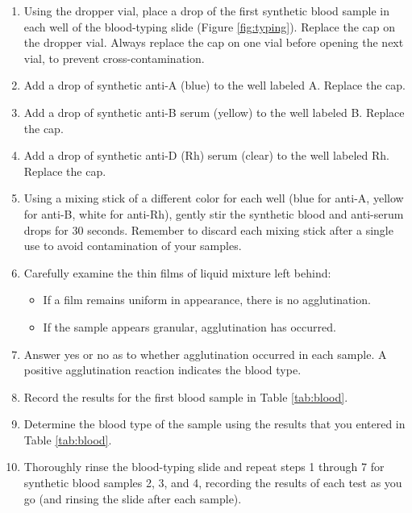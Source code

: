 \documentclass[]{book}
\providecommand{\tightlist}{%
  \setlength{\itemsep}{0pt}\setlength{\parskip}{0pt}}
\theoremstyle{definition}
\theoremstyle{definition}
\theoremstyle{definition}
\theoremstyle{remark}
\begin{document}
\begin{enumerate}
\def\labelenumi{\arabic{enumi}.}
\tightlist
\item
  Using the dropper vial, place a drop of the first synthetic blood
  sample in each well of the blood-typing slide (Figure
  \ref{fig:typing}). Replace the cap on the dropper vial. Always replace
  the cap on one vial before opening the next vial, to prevent
  cross-contamination.
\item
  Add a drop of synthetic anti-A (blue) to the well labeled A. Replace
  the cap.
\item
  Add a drop of synthetic anti-B serum (yellow) to the well labeled B.
  Replace the cap.
\item
  Add a drop of synthetic anti-D (Rh) serum (clear) to the well labeled
  Rh. Replace the cap.
\item
  Using a mixing stick of a different color for each well (blue for
  anti-A, yellow for anti-B, white for anti-Rh), gently stir the
  synthetic blood and anti-serum drops for 30 seconds. Remember to
  discard each mixing stick after a single use to avoid contamination of
  your samples.
\item
  Carefully examine the thin films of liquid mixture left behind:

  \begin{itemize}
  \tightlist
  \item
    If a film remains uniform in appearance, there is no agglutination.
  \item
    If the sample appears granular, agglutination has occurred.
  \end{itemize}
\item
  Answer yes or no as to whether agglutination occurred in each sample.
  A positive agglutination reaction indicates the blood type.
\item
  Record the results for the first blood sample in Table
  \ref{tab:blood}.
\item
  Determine the blood type of the sample using the results that you
  entered in Table \ref{tab:blood}.
\item
  Thoroughly rinse the blood-typing slide and repeat steps 1 through 7
  for synthetic blood samples 2, 3, and 4, recording the results of each
  test as you go (and rinsing the slide after each sample).
\end{enumerate}
\end{document}

